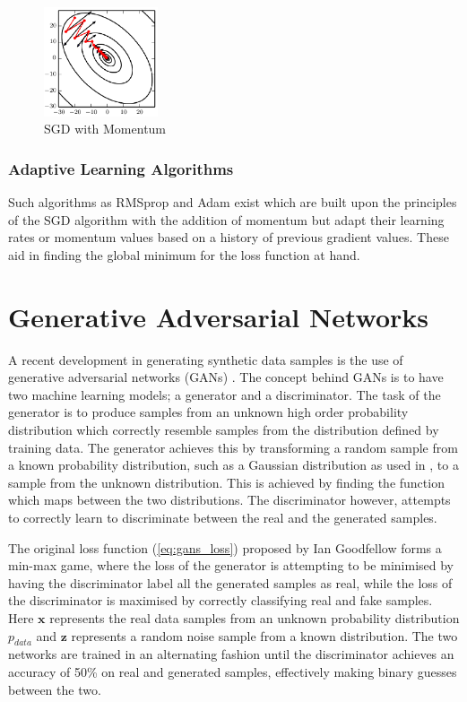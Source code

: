 \begin{figure}[h]
    \centering
        \includegraphics[width=0.3\textwidth]{figures/dl/momentum.png}
    \caption{SGD with Momentum \cite{Goodfellow-et-al-2016}}\label{fig:Momentum}
\end{figure}

\subsubsection{Adaptive Learning Algorithms}
Such algorithms as RMSprop and Adam exist which are built upon the principles of the SGD algorithm with the addition of momentum but adapt their learning rates or momentum values based on a history of previous gradient values.
These aid in finding the global minimum for the loss function at hand.

\section{Generative Adversarial Networks}

A recent development in generating synthetic data samples is the use of generative adversarial networks (GANs) \cite{Goodfellow2014}.
The concept behind GANs is to have two machine learning models; a generator and a discriminator.
The task of the generator is to produce samples from an unknown high order probability distribution which correctly resemble samples from the distribution defined by training data.
The generator achieves this by transforming a random sample from a known probability distribution, such as a Gaussian distribution as used in \cite{Goodfellow2014}, to a sample from the unknown distribution.
This is achieved by finding the function which maps between the two distributions.
The discriminator however, attempts to correctly learn to discriminate between the real and the generated samples.

The original loss function (\ref{eq:gans_loss}) proposed by Ian Goodfellow \cite{Goodfellow2014} forms a min-max game, where the loss of the generator is attempting to be minimised by having the discriminator label all the generated samples as real, while the loss of the discriminator is maximised by correctly classifying real and fake samples.
Here $\bm{x}$ represents the real data samples from an unknown probability distribution $p_{data}$ and $\bm{z}$ represents a random noise sample from a known distribution.
The two networks are trained in an alternating fashion until the discriminator achieves an accuracy of 50\% on real and generated samples, effectively making binary guesses between the two.

